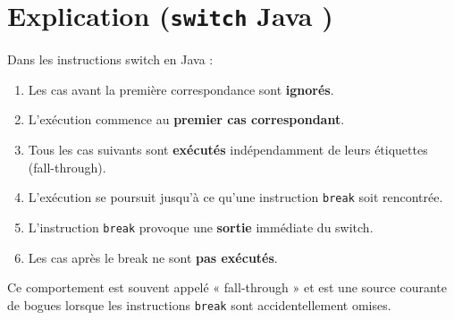 \documentclass{article}
\begin{document}
\noindent
\begin{minipage}[t]{0.39\textwidth}
\vspace{0pt}
\section*{Explication (\texttt{switch} Java \faJava)}
Dans les instructions switch en Java :
\begin{enumerate}
\item Les cas avant la première correspondance sont \textbf{ignorés}.
 \item L'exécution commence au \textbf{premier cas correspondant}.
 \item Tous les cas suivants sont \textbf{exécutés} indépendamment de leurs étiquettes (fall-through).
 \item L'exécution se poursuit jusqu'à ce qu'une instruction \texttt{break} soit rencontrée.
 \item L'instruction \texttt{break} provoque une \textbf{sortie} immédiate du switch.
 \item Les cas après le break ne sont \textbf{pas exécutés}.
\end{enumerate}
Ce comportement est souvent appelé « fall-through » et est une source courante de bogues lorsque les instructions \texttt{break} sont accidentellement omises.
\end{minipage}
\hspace{0.9cm}
\end{document}
